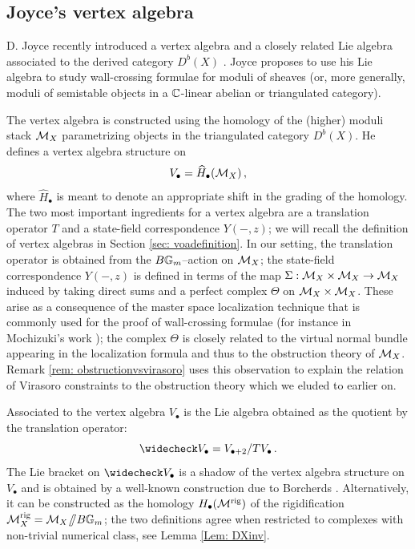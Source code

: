 \documentclass[a4paper, 12pt]{amsart}
\begin{document}
\subsection{Joyce's vertex algebra}
\label{sec: introvertexalgebra}


D. Joyce recently introduced a vertex algebra and a closely related Lie algebra associated to the derived category $D^b(X)$ \cite{Jo17,GJT, Jo21}. Joyce proposes to use his Lie algebra to study wall-crossing formulae for moduli of sheaves (or, more generally, moduli of semistable objects in a ${\mathbb{C}}$-linear abelian or triangulated category).

The vertex algebra is constructed using the homology of the (higher) moduli stack ${\mathcal M}_X$ parametrizing objects in the triangulated category $D^b(X)$. He defines a vertex algebra structure on
\[V_\bullet=\widehat{H}_\bullet({\mathcal M}_X)\,,\]
where $\widehat{H}_\bullet$ is meant to denote an appropriate shift in the grading of the homology.
The two most important ingredients for a vertex algebra are a translation operator $T$ and a state-field correspondence $Y(-,z)$; we will recall the definition of vertex algebras in Section \ref{sec: voadefinition}. In our setting, the translation operator is obtained from the $B{\mathbb{G}}_m$--action on ${\mathcal M}_X$; the state-field correspondence $Y(-,z)$ is defined in terms of the map 
$\Sigma:\mathcal{M}_X\times \mathcal{M}_X\to \mathcal{M}_X$ induced by taking direct sums and a perfect complex $\Theta$ on $\mathcal{M}_X\times \mathcal{M}_X$. These arise as a consequence of the master space localization technique that is commonly used for the proof of wall-crossing formulae (for instance in Mochizuki's work \cite{mochizuki}); the complex $\Theta$ is closely related to the virtual normal bundle appearing in the localization formula and thus to the obstruction theory of ${\mathcal M}_X$. Remark \ref{rem: obstructionvsvirasoro} uses this observation to explain the relation of Virasoro constraints to the obstruction theory which we eluded to earlier on. 

Associated to the vertex algebra $V_\bullet$ is the Lie algebra obtained as the quotient by the translation operator:
\[\widecheck V_{\bullet}= V_{\bullet+2}/T V_{\bullet}\,.\]
The Lie bracket on $\widecheck V_\bullet$ is a shadow of the vertex algebra structure on $V_\bullet$ and is obtained by a well-known construction due to Borcherds \cite{Borcherds}.
Alternatively, it can be constructed as the homology $H_\bullet({\mathcal M}^{\mathrm{rig}})$ of the rigidification ${\mathcal M}_X^{\mathrm{rig}}={\mathcal M}_X \mkern-7mu\fatslash B{\mathbb{G}}_m$; the two definitions agree when restricted to complexes with non-trivial numerical class, see Lemma \ref{Lem: DXinv}. 
\end{document}
